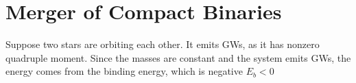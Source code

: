 \documentclass[11pt]{article}
\begin{document}
\section{Merger of Compact Binaries}
Suppose two stars are orbiting each other. It emits GWs, as it has nonzero quadruple moment. Since the masses are constant and the system emits GWs, the energy comes from the binding energy, which is negative $E_b<0$
    \begin{figure} [H]
        \begin{center}




\begin{tikzpicture}[x=0.75pt,y=0.75pt,yscale=-1,xscale=1]


\end{tikzpicture}
\end{center}
\end{figure}
\end{document}
